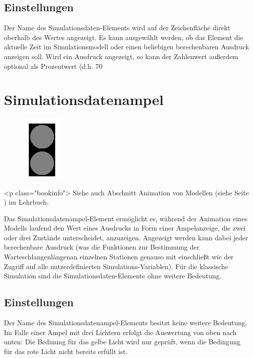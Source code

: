 \subsection*{Einstellungen}

Der Name des Simulationsdaten-Elements wird auf der Zeichenfläche direkt oberhalb des Wertes angezeigt.
Es kann ausgewählt werden, ob das Element die aktuelle Zeit im Simulationsmodell oder einen beliebigen
berechenbaren Ausdruck anzeigen soll. Wird ein Ausdruck angezeigt, so kann der Zahlenwert außerdem optional
als Prozentwert (d.h. 70%


\section{Simulationsdatenampel}
\label{ref:ModelElementAnimationTrafficLights}

\begin{figure}
\vspace{-22pt}
\includegraphics[width=2cm]{imageModelElementAnimationTrafficLights.png}
\vspace{-22pt}
\end{figure}

<p class="bookinfo">
Siehe auch Abschnitt Animation von Modellen (siehe Seite \pageref{ref:book:5.4.3}) im Lehrbuch.

Das Simulationsdatenampel-Element ermöglicht es, während der Animation eines Modells laufend den Wert
eines Ausdrucks in Form einer Ampelanzeige, die zwei oder drei Zustände unterscheidet, anzuzeigen.
Angezeigt werden kann dabei jeder berechenbare Ausdruck (was die Funktionen zur Bestimmung der
Warteschlangenlängenan einzelnen Stationen genauso mit einschließt wie der Zugriff auf alle nutzerdefinierten
Simulations-Variablen). Für die klassische Simulation sind die Simulationsdaten-Elemente ohne weitere Bedeutung.

\subsection*{Einstellungen}

Der Name des Simulationsdatenampel-Elements besitzt keine weitere Bedeutung. Im Falle einer Ampel mit drei
Lichtern erfolgt die Auswertung von oben nach unten: Die Bedinung für das gelbe Licht wird nur geprüft,
wenn die Bedingung für das rote Licht nicht bereits erfüllt ist.


